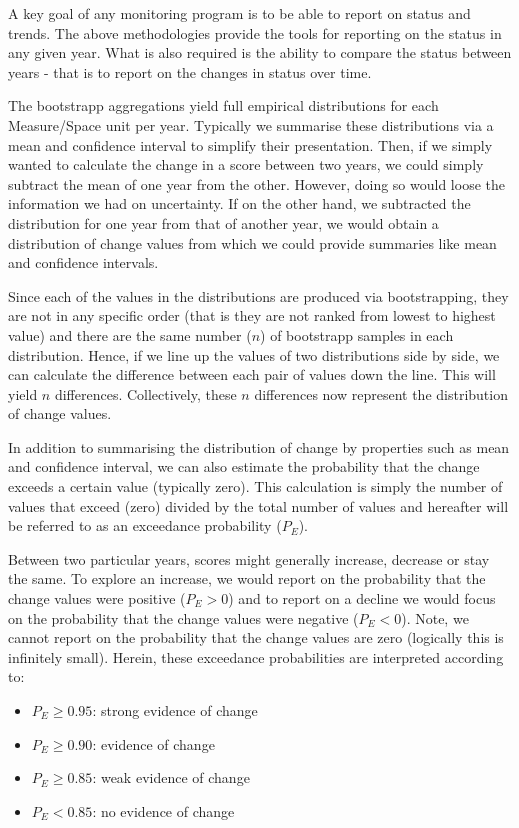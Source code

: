 \documentclass[
  8pt,
  a4paper]{article}
\providecommand{\tightlist}{%
  \setlength{\itemsep}{0pt}\setlength{\parskip}{0pt}}
\begin{document}
A key goal of any monitoring program is to be able to report on status
and trends. The above methodologies provide the tools for reporting on
the status in any given year. What is also required is the ability to
compare the status between years - that is to report on the changes in
status over time.

The bootstrapp aggregations yield full empirical distributions for each
Measure/Space unit per year. Typically we summarise these distributions
via a mean and confidence interval to simplify their presentation. Then,
if we simply wanted to calculate the change in a score between two
years, we could simply subtract the mean of one year from the other.
However, doing so would loose the information we had on uncertainty. If
on the other hand, we subtracted the distribution for one year from that
of another year, we would obtain a distribution of change values from
which we could provide summaries like mean and confidence intervals.

Since each of the values in the distributions are produced via
bootstrapping, they are not in any specific order (that is they are not
ranked from lowest to highest value) and there are the same number
(\(n\)) of bootstrapp samples in each distribution. Hence, if we line up
the values of two distributions side by side, we can calculate the
difference between each pair of values down the line. This will yield
\(n\) differences. Collectively, these \(n\) differences now represent
the distribution of change values.

In addition to summarising the distribution of change by properties such
as mean and confidence interval, we can also estimate the probability
that the change exceeds a certain value (typically zero). This
calculation is simply the number of values that exceed (zero) divided by
the total number of values and hereafter will be referred to as an
exceedance probability (\(P_E\)).

Between two particular years, scores might generally increase, decrease
or stay the same. To explore an increase, we would report on the
probability that the change values were positive (\(P_E>0\)) and to
report on a decline we would focus on the probability that the change
values were negative (\(P_E<0\)). Note, we cannot report on the
probability that the change values are zero (logically this is
infinitely small). Herein, these exceedance probabilities are
interpreted according to:

\begin{itemize}
\tightlist
\item
  \(P_E \ge 0.95\): strong evidence of change
\item
  \(P_E \ge 0.90\): evidence of change
\item
  \(P_E \ge 0.85\): weak evidence of change
\item
  \(P_E < 0.85\): no evidence of change
\end{itemize}
\end{document}
